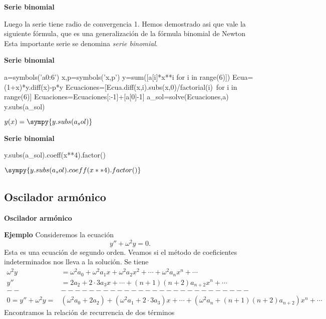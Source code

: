  \begin{frame}[fragile]{\textbf{Serie binomial}}

Luego la serie tiene radio de convergencia 1.  Hemos demostrado asi que vale la siguiente fórmula, que es una generalización de la fórmula binomial de Newton
Esta importante serie se denomina \emph{serie binomial}.
\end{frame}



 \begin{frame}[fragile]{\textbf{Serie binomial}}

\begin{sympyblock}[][numbers=left,frame=single,framesep=5mm]
a=symbols('a0:6')
x,p=symbols('x,p')
y=sum([a[i]*x**i for i in range(6)])
Ecua=(1+x)*y.diff(x)-p*y
Ecuaciones=[Ecua.diff(x,i).subs(x,0)/factorial(i)\
    for i in range(6)]
Ecuaciones=Ecuaciones[:-1]+[a[0]-1]
a_sol=solve(Ecuaciones,a)
y.subs(a_sol)
\end{sympyblock}
{\small
\(y(x)=\sympy{y.subs(a_sol)}\)
}
\end{frame}



 \begin{frame}[fragile]{\textbf{Serie binomial}}
\begin{sympyblock}[][numbers=left,frame=single,framesep=5mm]
y.subs(a_sol).coeff(x**4).factor()
\end{sympyblock}

\(\sympy{y.subs(a_sol).coeff(x**4).factor()}\)
\end{frame}




\subsection{Oscilador armónico}

 \begin{frame}[fragile]{\textbf{Oscilador armónico}}
 
\textbf{Ejemplo } Consideremos la ecuación
\[y''+\omega^2y=0.\]
Esta es una ecuación de segundo orden. Veamos si el método de coeficientes indeterminados nos lleva a la solución. Se tiene
\[\begin{split}
    \omega^2y&=\omega^2a_0+\omega^2a_1x+\omega^2a_2x^2+\cdots+\omega^2a_nx^n+\cdots\\
  y''&=2a_2+2\cdot 3a_3x+\cdots+(n+1)(n+2)a_{n+2}x^n+\cdots\\
--&---------------------------\\
0=y''+\omega^2y =& (\omega^2a_0+2a_2)+(\omega^2a_1+2\cdot 3a_3)x+\cdots +(\omega^2a_n+(n+1)(n+2)a_{n+2})x^n+\cdots
  \end{split}
\]
Encontramos la relación de recurrencia de dos términos

\end{frame}




